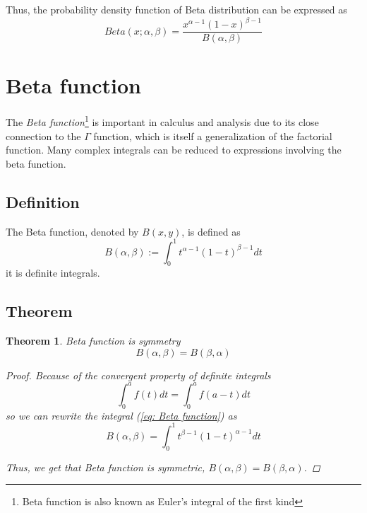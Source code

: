 \documentclass[a4paper]{article}
\newtheorem{theorem}{Theorem}[section]
\begin{document}
Thus, the probability density function of Beta distribution can be expressed as
\begin{equation}
    Beta(x; \alpha, \beta) = \frac{x^{\alpha-1} (1-x)^{\beta-1}}{B(\alpha, \beta)}
\end{equation}

\section{Beta function}
The \emph{Beta function}\footnote{Beta function is also known as Euler's integral of the first kind} is important in calculus and analysis due to its close connection to the $\Gamma$ function, which is itself a generalization of the factorial function.
Many complex integrals can be reduced to expressions involving the beta function.

\subsection{Definition}
The Beta function, denoted by $B(x, y)$, is defined as
\begin{equation}
    B(\alpha, \beta) := \int_{0}^{1} t^{\alpha-1} (1-t)^{\beta-1} dt
    \label{eq: Beta function}
\end{equation}
it is definite integrals.

\subsection{Theorem}

\begin{theorem}
    Beta function is symmetry
    \begin{equation}
        B(\alpha, \beta) = B(\beta, \alpha)
    \end{equation}

    \begin{proof}
        Because of the convergent property of definite integrals
        \begin{equation*}
            \int_{0}^{a} f(t) dt = \int_{0}^{a} f(a-t) dt
        \end{equation*}
        so we can rewrite the integral (\ref{eq: Beta function}) as
        \begin{equation*}
            B(\alpha, \beta) = \int_{0}^{1} t^{\beta-1} (1-t)^{\alpha-1} dt
        \end{equation*}

        Thus, we get that Beta function is symmetric, $B(\alpha, \beta) = B(\beta, \alpha)$.
    \end{proof}

\end{theorem}
\end{document}
